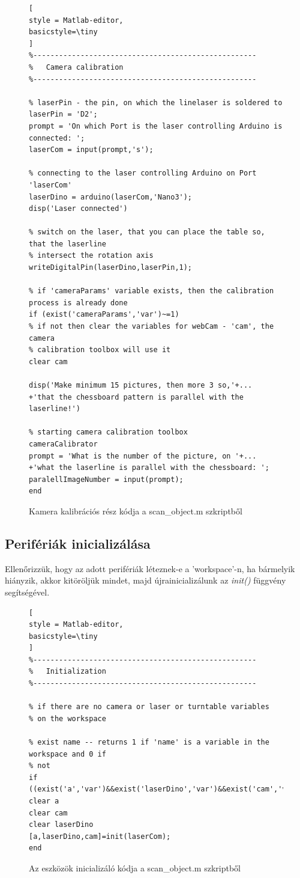 \documentclass[12pt,a4paper]{article}
\begin{document}
\begin{figure}[h!]
\centering
\begin{lstlisting}[
style = Matlab-editor,
basicstyle=\tiny
]
%----------------------------------------------------
%   Camera calibration
%----------------------------------------------------

% laserPin - the pin, on which the linelaser is soldered to
laserPin = 'D2';
prompt = 'On which Port is the laser controlling Arduino is connected: ';
laserCom = input(prompt,'s');

% connecting to the laser controlling Arduino on Port 'laserCom'
laserDino = arduino(laserCom,'Nano3');
disp('Laser connected')

% switch on the laser, that you can place the table so, that the laserline
% intersect the rotation axis
writeDigitalPin(laserDino,laserPin,1);

% if 'cameraParams' variable exists, then the calibration process is already done 
if (exist('cameraParams','var')~=1)
% if not then clear the variables for webCam - 'cam', the camera
% calibration toolbox will use it
clear cam

disp('Make minimum 15 pictures, then more 3 so,'+... 
+'that the chessboard pattern is parallel with the laserline!')

% starting camera calibration toolbox
cameraCalibrator
prompt = 'What is the number of the picture, on '+...
+'what the laserline is parallel with the chessboard: ';
paralellImageNumber = input(prompt);
end
\end{lstlisting}
\caption{Kamera kalibrációs rész kódja a scan\_object.m szkriptből}
\end{figure}

\subsection{Perifériák inicializálása}
Ellenőrizzük, hogy az adott perifériák léteznek-e a 'workspace'-n, ha bármelyik hiányzik, akkor kitöröljük mindet, majd újrainicializálunk az \textit{init()} függvény segítségével.
\begin{figure}[h!]
\centering
\begin{lstlisting}[
style = Matlab-editor,
basicstyle=\tiny
]
%----------------------------------------------------
%   Initialization
%----------------------------------------------------

% if there are no camera or laser or turntable variables
% on the workspace

% exist name -- returns 1 if 'name' is a variable in the workspace and 0 if
% not
if ((exist('a','var')&&exist('laserDino','var')&&exist('cam','var'))~=1)
clear a
clear cam
clear laserDino
[a,laserDino,cam]=init(laserCom);
end
\end{lstlisting}
\caption{Az eszközök inicializáló kódja a scan\_object.m szkriptből}
\end{figure}
	
\end{document}
